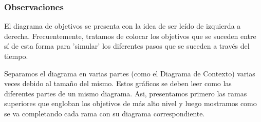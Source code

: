 \vspace{1em}

\subsubsection{Observaciones}

El diagrama de objetivos se presenta con la idea de ser leído de izquierda a derecha. Frecuentemente, tratamos de colocar los objetivos que se suceden entre sí de esta forma para 'simular' los diferentes pasos que se suceden a través del tiempo.

Separamos el diagrama en varias partes (como el Diagrama de Contexto) varias veces debido al tamaño del mismo. Estos gráficos se deben leer como las diferentes partes de un mismo diagrama. Asi, presentamos primero las ramas superiores que engloban los objetivos de más alto nivel y luego mostramos como se va completando cada rama con su diagrama correspondiente.
